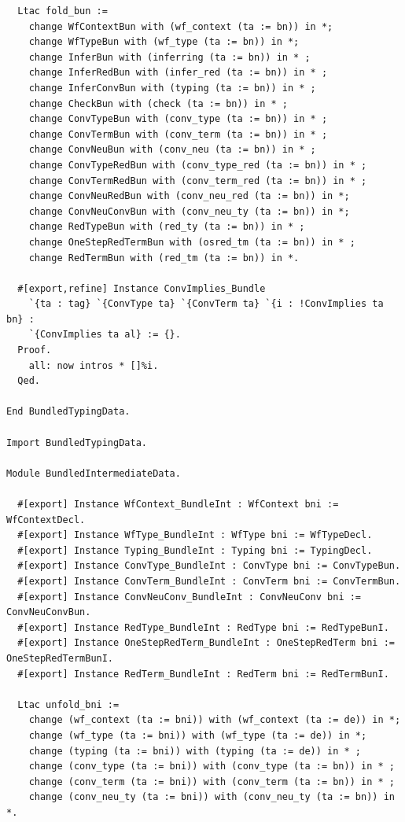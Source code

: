 \begin{lstlisting}
  Ltac fold_bun :=
    change WfContextBun with (wf_context (ta := bn)) in *;
    change WfTypeBun with (wf_type (ta := bn)) in *;
    change InferBun with (inferring (ta := bn)) in * ;
    change InferRedBun with (infer_red (ta := bn)) in * ;
    change InferConvBun with (typing (ta := bn)) in * ;
    change CheckBun with (check (ta := bn)) in * ;
    change ConvTypeBun with (conv_type (ta := bn)) in * ;
    change ConvTermBun with (conv_term (ta := bn)) in * ;
    change ConvNeuBun with (conv_neu (ta := bn)) in * ;
    change ConvTypeRedBun with (conv_type_red (ta := bn)) in * ;
    change ConvTermRedBun with (conv_term_red (ta := bn)) in * ;
    change ConvNeuRedBun with (conv_neu_red (ta := bn)) in *;
    change ConvNeuConvBun with (conv_neu_ty (ta := bn)) in *;
    change RedTypeBun with (red_ty (ta := bn)) in * ;
    change OneStepRedTermBun with (osred_tm (ta := bn)) in * ;
    change RedTermBun with (red_tm (ta := bn)) in *.

  #[export,refine] Instance ConvImplies_Bundle
    `{ta : tag} `{ConvType ta} `{ConvTerm ta} `{i : !ConvImplies ta bn} : 
    `{ConvImplies ta al} := {}.
  Proof.
    all: now intros * []%i.
  Qed.

End BundledTypingData.

Import BundledTypingData.

Module BundledIntermediateData.

  #[export] Instance WfContext_BundleInt : WfContext bni := WfContextDecl.
  #[export] Instance WfType_BundleInt : WfType bni := WfTypeDecl.
  #[export] Instance Typing_BundleInt : Typing bni := TypingDecl.
  #[export] Instance ConvType_BundleInt : ConvType bni := ConvTypeBun.
  #[export] Instance ConvTerm_BundleInt : ConvTerm bni := ConvTermBun.
  #[export] Instance ConvNeuConv_BundleInt : ConvNeuConv bni := ConvNeuConvBun.
  #[export] Instance RedType_BundleInt : RedType bni := RedTypeBunI.
  #[export] Instance OneStepRedTerm_BundleInt : OneStepRedTerm bni := OneStepRedTermBunI.
  #[export] Instance RedTerm_BundleInt : RedTerm bni := RedTermBunI.

  Ltac unfold_bni :=
    change (wf_context (ta := bni)) with (wf_context (ta := de)) in *;
    change (wf_type (ta := bni)) with (wf_type (ta := de)) in *;
    change (typing (ta := bni)) with (typing (ta := de)) in * ;
    change (conv_type (ta := bni)) with (conv_type (ta := bn)) in * ;
    change (conv_term (ta := bni)) with (conv_term (ta := bn)) in * ;
    change (conv_neu_ty (ta := bni)) with (conv_neu_ty (ta := bn)) in *.


\end{lstlisting}
